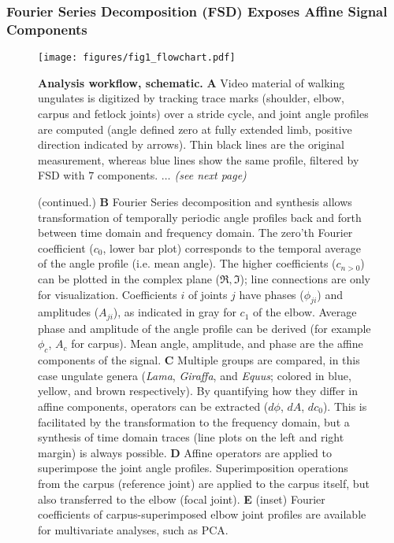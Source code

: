 \documentclass[10pt, a4paper]{article}
\begin{document}
\subsubsection{Fourier Series Decomposition (FSD) Exposes Affine Signal Components}

\begin{figure}[b!]
\begin{center}
\texttt{[image: figures/fig1\_flowchart.pdf]}
\end{center}
\caption[Workflow]{\textbf{Analysis workflow, schematic.} 
\textbf{A} Video material of walking ungulates is digitized by tracking trace marks (shoulder, elbow, carpus and fetlock joints) over a stride cycle, and joint angle profiles are computed (angle defined zero at fully extended limb, positive direction indicated by arrows). Thin black lines are the original measurement, whereas blue lines show the same profile, filtered by FSD with $7$ components. 
\textit{\(\ldots\) (see next page)}
 }
\label{fig:workflow}
\end{figure}
\addtocounter{figure}{-1}
\begin{figure}[t!]
  \caption{(continued.)
\textbf{B} Fourier Series decomposition and synthesis allows transformation of temporally periodic angle profiles back and forth between time domain and frequency domain. The zero'th Fourier coefficient ($c_{0}$, lower bar plot) corresponds to the temporal average of the angle profile (i.e. mean angle). The higher coefficients ($c_{n>0}$) can be plotted in the complex plane ($\Re, \Im$); line connections are only for visualization. Coefficients $i$ of joints $j$ have phases ($\phi_{ji}$) and amplitudes ($A_{ji}$), as indicated in gray for $c_{1}$ of the elbow. Average phase and amplitude of the angle profile can be derived (for example $\phi_{c}$, $A_{c}$ for carpus). Mean angle, amplitude, and phase are the affine components of the signal.
 \textbf{C} Multiple groups are compared, in this case ungulate genera (\textit{Lama}, \textit{Giraffa}, and \textit{Equus}; colored in blue, yellow, and brown respectively). By quantifying how they differ in affine components, operators can be extracted ($d\phi$, $dA$, $dc_{0}$). This is facilitated by the transformation to the frequency domain, but a synthesis of time domain traces (line plots on the left and right margin) is always possible. 
 \textbf{D} Affine operators are applied to superimpose the joint angle profiles. Superimposition operations from the carpus (reference joint) are applied to the carpus itself, but also transferred to the elbow (focal joint). 
\textbf{E} (inset) Fourier coefficients of carpus-superimposed elbow joint profiles are available for multivariate analyses, such as PCA.  
  }
\end{figure}
\end{document}
